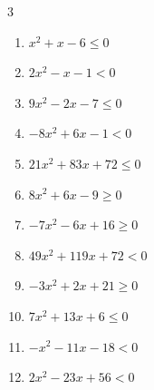 \begin{multicols}{3}
\begin{enumerate}
        \phantom{$\displaystyle x < -4 , \; 2 < x$}

  \item $x^{2}+x-6\leq 0$

        \phantom{$\displaystyle -3 \leqq x \leqq 2$}

  \item $2x^{2}-x-1<0$


  \item $9x^{2}-2x-7\leq 0$


\columnbreak %

  \item $-8x^{2}+6x-1<0$


  \item $21x^{2}+83x+72\leq 0$


  \item $8x^{2}+6x-9\geq 0$


  \item $-7x^{2}-6x+16\geq 0$


  \item $49x^{2}+119x+72<0$


  \item $-3x^{2}+2x+21\geq 0$


  \item $7x^{2}+13x+6\leq 0$


  \item $-x^{2}-11x-18<0$

        \phantom{$\displaystyle x < -9 , \; -2 < x$}

  \item $2x^{2}-23x+56<0$


\end{enumerate}
\end{multicols}
